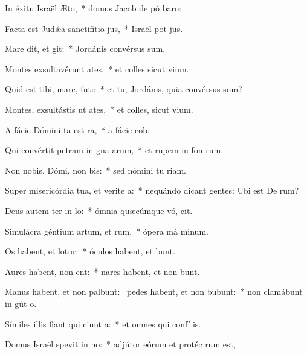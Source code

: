 \item In éxitu Israël  Æto,~* domus Jacob de pó baro:
\item Facta est Judǽa sanctifitio jus,~* Israël pot jus.
\item Mare dit, et git:~* Jordánis convérsus  sum.
\item Montes exsultavérunt  ates,~* et colles sicut  vium.
\item Quid est tibi, mare,  futi:~* et tu, Jordánis, quia convérsus  sum?
\item Montes, exsultástis ut ates,~* et colles, sicut  vium.
\item A fácie Dómini ta est ra,~* a fácie  cob.
\item Qui convértit petram in gna arum,~* et rupem in fon rum.
\item Non nobis, Dómi, non bis:~* sed nómini tu  riam.
\item Super misericórdia tua, et verite a:~* nequándo dicant gentes: Ubi est De rum?
\item Deus autem ter in lo:~* ómnia quæcúmque vó, cit.
\item Simulácra géntium artum, et rum,~* ópera má minum.
\item Os habent, et  lotur:~* óculos habent, et  bunt.
\item Aures habent,  non ent:~* nares habent, et non bunt.
\item Manus habent, et non palbunt:~\pscross{} pedes habent, et non bubunt:~* non clamábunt in gút o.
\item Símiles illis fiant qui ciunt a:~* et omnes qui confí  is.
\item Domus Israël spevit in no:~* adjútor eórum et protéc rum est,
